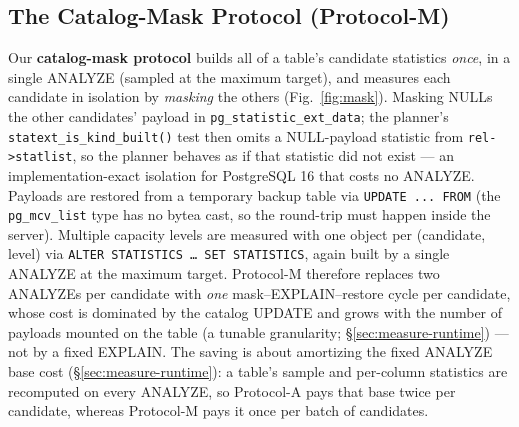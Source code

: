 \documentclass[sigconf, nonacm]{acmart}
\begin{document}
\subsection{The Catalog-Mask Protocol (Protocol-M)}
\label{sec:measure-mask}

Our \textbf{catalog-mask protocol} builds all of a table's candidate statistics
\emph{once}, in a single ANALYZE (sampled at the maximum target), and measures
each candidate in isolation by \emph{masking} the others (Fig.~\ref{fig:mask}).
Masking NULLs the
other candidates' payload in \texttt{pg\_statistic\_ext\_data}; the planner's
\texttt{statext\_is\_kind\_built()} test then omits a NULL-payload statistic from
\texttt{rel->statlist}, so the planner behaves as if that statistic did not
exist --- an implementation-exact isolation for PostgreSQL 16 that costs no
ANALYZE. Payloads are restored from a
temporary backup table via \texttt{UPDATE ... FROM} (the \texttt{pg\_mcv\_list}
type has no bytea cast, so the round-trip must happen inside the server).
Multiple capacity levels are measured with one object per (candidate, level)
via \texttt{ALTER STATISTICS}\allowbreak\texttt{ \dots\ SET STATISTICS}, again built by a single
ANALYZE at the maximum target. Protocol-M therefore replaces two ANALYZEs per
candidate with \emph{one} mask--EXPLAIN--restore cycle per candidate, whose cost
is dominated by the catalog UPDATE and grows with the number of payloads
mounted on the table (a tunable granularity; \S\ref{sec:measure-runtime}) ---
not by a fixed EXPLAIN. The saving is about amortizing the fixed ANALYZE
base cost (\S\ref{sec:measure-runtime}): a table's sample and per-column
statistics are recomputed on every ANALYZE, so Protocol-A pays that base twice
per candidate, whereas Protocol-M pays it once per batch of candidates.
\end{document}
